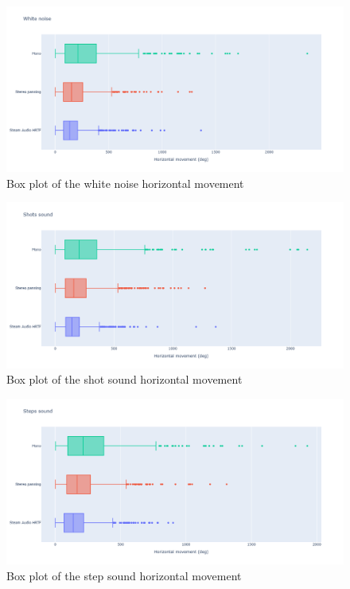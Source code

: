 \documentclass[conference]{IEEEtran}
\begin{document}
\begin{figure}[htbp]
\centerline{\includegraphics[scale=0.22]{white_hor.png}}
\caption{Box plot of the white noise horizontal movement}
\label{fig6}
\end{figure}
\begin{figure}[htbp]
\centerline{\includegraphics[scale=0.22]{shot_hor.png}}
\caption{Box plot of the shot sound horizontal movement}
\label{fig7}
\end{figure}
\begin{figure}[htbp]
\centerline{\includegraphics[scale=0.22]{step_hor.png}}
\caption{Box plot of the step sound horizontal movement}
\label{fig8}
\end{figure}
\end{document}
